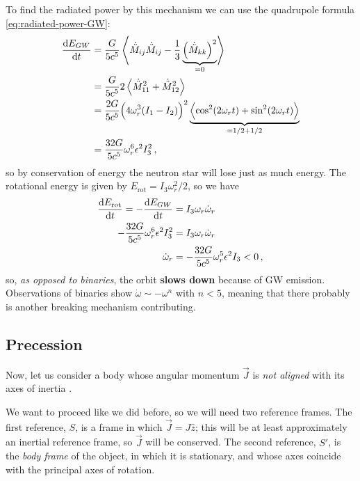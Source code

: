 \documentclass[main.tex]{subfiles}
\begin{document}
To find the radiated power by this mechanism we can use the quadrupole formula \eqref{eq:radiated-power-GW}: 
%
\begin{align}
\dv{E_{GW}}{t} &= \frac{G}{5 c^{5}} \expval{
    \dot{\ddot{M}}_{ij} \dot{\ddot{M}}_{ij} - \frac{1}{3} \underbrace{\qty(\dot{\ddot{M}}_{kk})^2}_{= 0}
}  \\
&= \frac{G}{5c^{5}} 2 \expval{ \dot{\ddot{M}}_{11}^2 + \dot{\ddot{M}}_{12}^2}  \\
&= \frac{2G}{5c^{5}} \qty(4 \omega_{r}^3 (I_1 - I_2 ))^2 \underbrace{\expval{ \cos^2(2 \omega_{r}t) + \sin^2(2 \omega_{r}t)}}_{= 1/2 + 1/2}  \\
&= \frac{32 G}{5 c^{5}} \omega_{r}^{6} \epsilon^2 I_3^2
\,,
\end{align}
%
so by conservation of energy the neutron star will lose just as much energy. 
The rotational energy is given by \(E _{\text{rot}} = I_{3} \omega_{r}^2 / 2\), so we have 
%
\begin{align}
\dv{E _{\text{rot}}}{t} = - \dv{E_{GW}}{t} &= I_3 \omega_{r} \dot{\omega}_{r}  \\
- \frac{32 G}{5 c^{5}} \omega_{r}^{6} \epsilon^2 I_3^2 &= I_3 \omega_{r} \dot{\omega}_{r}  \\
\dot{\omega}_{r} &= - \frac{32G}{5 c^{5}} \omega_{r}^{5} \epsilon^2 I_3 <0
\,,
\end{align}
%
so, \emph{as opposed to binaries}, the orbit \textbf{slows down} because of GW emission.
Observations of binaries show \(\dot{\omega} \sim - \omega^{n} \) with \(n < 5\), meaning that there probably is another breaking mechanism contributing.   

\subsection{Precession}

Now, let us consider a body whose angular momentum \(\vec{J}\) is \emph{not aligned} with its axes of inertia \cite[sec.\ 4.2.2]{maggioreGravitationalWavesVolume2007}. 

We want to proceed like we did before, so we will need two reference frames. 
The first reference, \(S\), is a frame in which \(\vec{J} = J \hat{z}\); this will be at least approximately an inertial reference frame, so \(\vec{J}\) will be conserved.  
The second reference, \(S'\), is the \emph{body frame} of the object, in which it is stationary, and whose axes coincide with the principal axes of rotation. 
\end{document}
